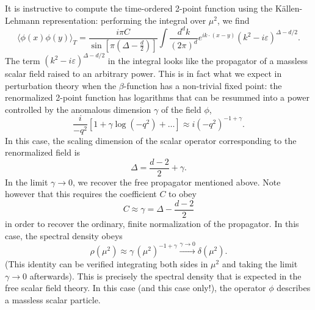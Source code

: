 \documentclass[a4paper,12pt]{article}
\numberwithin{equation}{section}
\begin{document}
It is instructive to compute the time-ordered 2-point function using the Källen-Lehmann representation: performing the integral over $\mu^2$, we find
\begin{equation}
	\langle \phi(x) \phi(y) \rangle_T
	= \frac{i \pi C}
	{\sin\left[ \pi \left( \Delta - \frac{d}{2} \right) \right]}
	\int \frac{d^dk}{(2\pi)^d}
	e^{i k \cdot (x - y)}
	\left( k^2 - i \varepsilon \right)^{\Delta - d/2}.
\end{equation}
The term $\left( k^2 - i \varepsilon \right)^{\Delta - d/2}$ in the integral looks like the propagator of a massless scalar field raised to an arbitrary power. This is in fact what we expect in perturbation theory when the $\beta$-function has a non-trivial fixed point: the renormalized 2-point function has logarithms that can be resummed into a power controlled by the anomalous dimension $\gamma$ of the field $\phi$,
\begin{equation}
	\frac{i}{-q^2} \left[ 1 + \gamma \log(-q^2) + \ldots \right]
	\approx i (-q^2)^{-1 + \gamma}.
\end{equation}
In this case, the scaling dimension of the scalar operator corresponding to the renormalized field is
\begin{equation}
	\Delta = \frac{d-2}{2} + \gamma.
\end{equation}
In the limit $\gamma \to 0$, we recover the free propagator mentioned above.
Note however that this requires the coefficient $C$ to obey
\begin{equation}
	C \approx \gamma = \Delta - \frac{d-2}{2}
	\label{eq:C:freelimit}
\end{equation}
in order to recover the ordinary, finite normalization of the propagator.
In this case, the spectral density obeys
\begin{equation}
	\rho(\mu^2) \approx \gamma \, (\mu^2)^{-1 + \gamma}
	\xrightarrow{\gamma \to 0} \delta(\mu^2).
\end{equation}
(This identity can be verified integrating both sides in $\mu^2$ and taking the limit $\gamma \to 0$ afterwards).
This is precisely the spectral density that is expected in the free scalar field theory. In this case (and this case only!), the operator $\phi$ describes a massless scalar particle.
\end{document}
